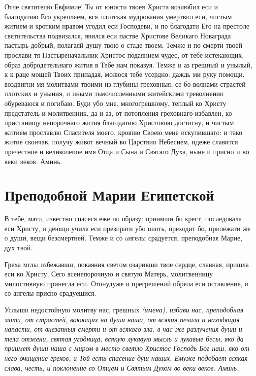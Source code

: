 Отче святителю Евфимие! Ты от юности твоея Христа возлюбил еси и благодатию Его укрепляем, вся плотская мудрования умертвил еси, чистым житием и кротким нравом угодил еси Господеви, и по благодати Его на престоле святительства подвизался, явился еси пастве Христове Великаго Новаграда пастырь добрый, полагаяй душу твою о стаде твоем. Темже и по смерти твоей прослави тя Пастыреначальник Христос подаянием чудес, от тебе истекающих, образ добродетельнаго жития в Тебе нам показуя. Темже и аз грешный и унылый, к к раце мощей Твоих припадая, молюся тебе усердно: даждь ми руку помощи, воздвигни мя молитвами твоими из глубины греховныя, се бо волнами страстей плотских и уныния, и иными тьмочисленными житейскими треволнении обуреваюся и погибаю. Буди убо мне, многогрешному, теплый ко Христу предстатель и молитвенник, да и аз, от потопления греховнаго избавлен, ко пристанищу непорочнаго жития благодатию Христовою достигну, и чистым житием прославлю Спасителя моего, кровию Своею мене искупившаго: и тако житие скончав, получу живот вечный во Царствии Небеснем, идеже славится пречестное и великолепое имя Отца и Сына и Святаго Духа, ныне и присно и во веки веков. Аминь. 


\section{Преподобной Марии  Египетской}
 




В тебе, мати, известно спасеся еже по образу: приимши бо крест, последовала еси Христу, и деющи учила еси презирати убо плоть, преходит бо, прилежати же о души, вещи безсмертней. Темже и со aнгелы срадуется, преподобная Марие, дух твой.




Греха мглы избежавши, покаяния светом озаривши твое сердце, славная, пришла еси ко Христу, Сего всенепорочную и святую Матерь, молитвенницу милостивную принесла еси. Отонудуже и прегрешений обрела еси оставление, и со ангелы присно срадуешися.




Услыши недостойную молитву нас, грешных \itshape (имена),\normalfont{} избави нас, преподобная мати, от страстей, воюющих на души наша, от всякия печали и находящия напасти, от внезапныя смерти и от всякого зла, в час же разлучения души и тела отжени, святая угодница, всякую лукавую мысль и лукавые бесы, яко да приимет души наша с миром в место светло Христос Господь Бог наш, яко от него очищение грехов, и Той есть спасение душ наших, Емуже подобает всякая слава, честь; и поклонение со Отцем и Святым Духом во веки веков. Аминь.


